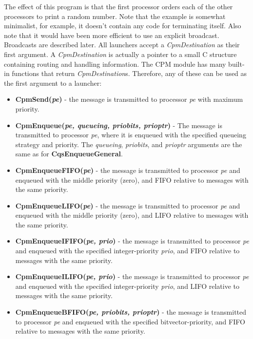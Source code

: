 The effect of this program is that the first processor orders each of
the other processors to print a random number.  Note that the example
is somewhat minimalist, for example, it doesn't contain any code for
terminating itself.  Also note that it would have been more efficient
to use an explicit broadcast.  Broadcasts are described later.
\pagebreak
All launchers accept a {\it CpmDestination} as their first argument.  A
{\it CpmDestination} is actually a pointer to a small C structure
containing routing and handling information.  The CPM module has many
built-in functions that return {\it CpmDestination}s.  Therefore, any
of these can be used as the first argument to a launcher:

\begin{itemize}

\item[]{{\bf CpmSend({\it pe})} - the message is transmitted to
processor {\it pe} with maximum priority}.

\item[]{{\bf CpmEnqueue({\it pe, queueing, priobits, prioptr})}
- The message is transmitted to processor {\it pe}, where it is
enqueued with the specified queueing strategy and priority.  The {\it
queueing}, {\it priobits}, and {\it prioptr} arguments are the same as
for {\bf CqsEnqueueGeneral}.}

\item[]{{\bf CpmEnqueueFIFO({\it pe})} - the message is transmitted to
processor {\it pe} and enqueued with the middle priority (zero), and
FIFO relative to messages with the same priority.}

\item[]{{\bf CpmEnqueueLIFO({\it pe})} - the message is transmitted to
processor {\it pe} and enqueued with the middle priority (zero), and
LIFO relative to messages with the same priority.}

\item[]{{\bf CpmEnqueueIFIFO({\it pe, prio})} - the message is
transmitted to processor {\it pe} and enqueued with the specified
integer-priority {\it prio}, and FIFO relative to messages with the
same priority.}

\item[]{{\bf CpmEnqueueILIFO({\it pe, prio})} - the message is
transmitted to processor {\it pe} and enqueued with the specified
integer-priority {\it prio}, and LIFO relative to messages with the
same priority.}

\item[]{{\bf CpmEnqueueBFIFO({\it pe, priobits, prioptr})} - the
message is transmitted to processor {\it pe} and enqueued with the
specified bitvector-priority, and FIFO relative to messages
with the same priority.}


\end{itemize}
